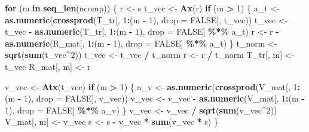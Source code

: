 \documentclass[
]{article}
\newenvironment{Shaded}{\begin{snugshade}}{\end{snugshade}}
\newcommand{\AttributeTok}[1]{\textcolor[rgb]{0.13,0.29,0.53}{#1}}
\newcommand{\ConstantTok}[1]{\textcolor[rgb]{0.56,0.35,0.01}{#1}}
\newcommand{\ControlFlowTok}[1]{\textcolor[rgb]{0.13,0.29,0.53}{\textbf{#1}}}
\newcommand{\DecValTok}[1]{\textcolor[rgb]{0.00,0.00,0.81}{#1}}
\newcommand{\FunctionTok}[1]{\textcolor[rgb]{0.13,0.29,0.53}{\textbf{#1}}}
\newcommand{\NormalTok}[1]{#1}
\newcommand{\OtherTok}[1]{\textcolor[rgb]{0.56,0.35,0.01}{#1}}
\newcommand{\SpecialCharTok}[1]{\textcolor[rgb]{0.81,0.36,0.00}{\textbf{#1}}}
\begin{document}
\begin{Shaded}
\begin{Highlighting}[]
  \ControlFlowTok{for}\NormalTok{ (m }\ControlFlowTok{in} \FunctionTok{seq\_len}\NormalTok{(ncomp)) \{}
\NormalTok{    r }\OtherTok{\textless{}{-}}\NormalTok{ s}
\NormalTok{    t\_vec }\OtherTok{\textless{}{-}} \FunctionTok{Ax}\NormalTok{(r)}
    \ControlFlowTok{if}\NormalTok{ (m }\SpecialCharTok{\textgreater{}} \DecValTok{1}\NormalTok{) \{}
\NormalTok{      a\_t   }\OtherTok{\textless{}{-}} \FunctionTok{as.numeric}\NormalTok{(}\FunctionTok{crossprod}\NormalTok{(T\_tr[, }\DecValTok{1}\SpecialCharTok{:}\NormalTok{(m }\SpecialCharTok{{-}} \DecValTok{1}\NormalTok{), }\AttributeTok{drop =} \ConstantTok{FALSE}\NormalTok{], t\_vec))}
\NormalTok{      t\_vec }\OtherTok{\textless{}{-}}\NormalTok{ t\_vec }\SpecialCharTok{{-}} \FunctionTok{as.numeric}\NormalTok{(T\_tr[, }\DecValTok{1}\SpecialCharTok{:}\NormalTok{(m }\SpecialCharTok{{-}} \DecValTok{1}\NormalTok{), }\AttributeTok{drop =} \ConstantTok{FALSE}\NormalTok{] }\SpecialCharTok{\%*\%}\NormalTok{ a\_t)}
\NormalTok{      r     }\OtherTok{\textless{}{-}}\NormalTok{ r     }\SpecialCharTok{{-}} \FunctionTok{as.numeric}\NormalTok{(R\_mat[, }\DecValTok{1}\SpecialCharTok{:}\NormalTok{(m }\SpecialCharTok{{-}} \DecValTok{1}\NormalTok{), }\AttributeTok{drop =} \ConstantTok{FALSE}\NormalTok{] }\SpecialCharTok{\%*\%}\NormalTok{ a\_t)}
\NormalTok{    \}}
\NormalTok{    t\_norm }\OtherTok{\textless{}{-}} \FunctionTok{sqrt}\NormalTok{(}\FunctionTok{sum}\NormalTok{(t\_vec}\SpecialCharTok{\^{}}\DecValTok{2}\NormalTok{))}
\NormalTok{    t\_vec  }\OtherTok{\textless{}{-}}\NormalTok{ t\_vec }\SpecialCharTok{/}\NormalTok{ t\_norm}
\NormalTok{    r      }\OtherTok{\textless{}{-}}\NormalTok{ r }\SpecialCharTok{/}\NormalTok{ t\_norm}
\NormalTok{    T\_tr[, m]  }\OtherTok{\textless{}{-}}\NormalTok{ t\_vec}
\NormalTok{    R\_mat[, m] }\OtherTok{\textless{}{-}}\NormalTok{ r}
    
\NormalTok{    v\_vec }\OtherTok{\textless{}{-}} \FunctionTok{Atx}\NormalTok{(t\_vec)}
    \ControlFlowTok{if}\NormalTok{ (m }\SpecialCharTok{\textgreater{}} \DecValTok{1}\NormalTok{) \{}
\NormalTok{      a\_v   }\OtherTok{\textless{}{-}} \FunctionTok{as.numeric}\NormalTok{(}\FunctionTok{crossprod}\NormalTok{(V\_mat[, }\DecValTok{1}\SpecialCharTok{:}\NormalTok{(m }\SpecialCharTok{{-}} \DecValTok{1}\NormalTok{), }\AttributeTok{drop =} \ConstantTok{FALSE}\NormalTok{], v\_vec))}
\NormalTok{      v\_vec }\OtherTok{\textless{}{-}}\NormalTok{ v\_vec }\SpecialCharTok{{-}} \FunctionTok{as.numeric}\NormalTok{(V\_mat[, }\DecValTok{1}\SpecialCharTok{:}\NormalTok{(m }\SpecialCharTok{{-}} \DecValTok{1}\NormalTok{), }\AttributeTok{drop =} \ConstantTok{FALSE}\NormalTok{] }\SpecialCharTok{\%*\%}\NormalTok{ a\_v)}
\NormalTok{    \}}
\NormalTok{    v\_vec }\OtherTok{\textless{}{-}}\NormalTok{ v\_vec }\SpecialCharTok{/} \FunctionTok{sqrt}\NormalTok{(}\FunctionTok{sum}\NormalTok{(v\_vec}\SpecialCharTok{\^{}}\DecValTok{2}\NormalTok{))}
\NormalTok{    V\_mat[, m] }\OtherTok{\textless{}{-}}\NormalTok{ v\_vec}
\NormalTok{    s }\OtherTok{\textless{}{-}}\NormalTok{ s }\SpecialCharTok{{-}}\NormalTok{ v\_vec }\SpecialCharTok{*} \FunctionTok{sum}\NormalTok{(v\_vec }\SpecialCharTok{*}\NormalTok{ s)}
\NormalTok{  \}}
  

\end{Highlighting}
\end{Shaded}
\end{document}
